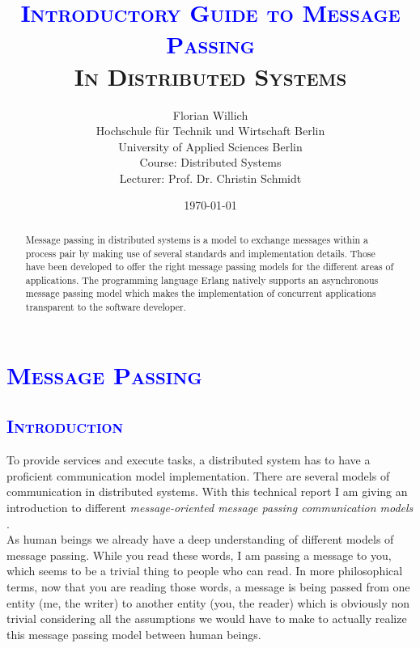 \documentclass[xcolor=dvipsnames]{article}
\title{\scshape{\textbf{\textcolor{blue}{Introductory Guide to Message Passing}}\\In Distributed Systems}}
\author{Florian Willich \\ Hochschule f\"ur Technik und Wirtschaft Berlin \\ University of Applied Sciences Berlin \\ Course: Distributed Systems \\ Lecturer: Prof. Dr. Christin Schmidt}
\date{\today}
\begin{document}

\begin{titlepage}

\maketitle

\begin{abstract}
Message passing in distributed systems is a model to exchange messages within a process pair by making use of several standards and implementation details. Those have been developed to offer the right message passing models for the different areas of applications. The programming language Erlang natively supports an asynchronous message passing model which makes the implementation of concurrent applications transparent to the software developer.
\end{abstract}

\end{titlepage}

\newpage

\tableofcontents

\newpage


\section{\scshape{\textcolor{blue}{Message Passing}}} \label{introduction}

\subsection{\scshape{\textcolor{blue}{Introduction}}}

To provide services and execute tasks, a distributed system has to have a proficient communication model implementation. There are several models of communication in distributed systems. With this technical report I am giving an introduction to different \textit{message-oriented message passing communication models} \cite[chap. 4.3 on p. 140 - 141]{tanenbaum}.\\

\noindent As human beings we already have a deep understanding of different models of message passing. While you read these words, I am passing a message to you, which seems to be a trivial thing to people who can read. In more philosophical terms, now that you are reading those words, a message is being passed from one entity (me, the writer) to another entity (you, the reader) which is obviously non trivial considering all the assumptions we would have to make to actually realize this message passing model between human beings.\\
\end{document}
